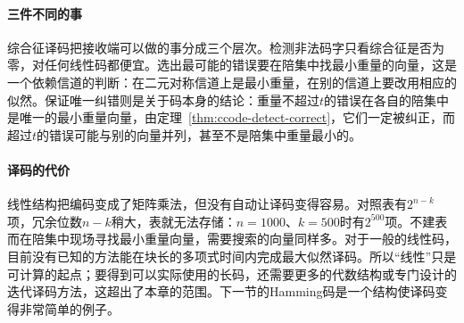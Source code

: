 \paragraph{三件不同的事}
综合征译码把接收端可以做的事分成三个层次。检测非法码字只看综合征是否为零，对任何线性码都便宜。选出最可能的错误要在陪集中找最小重量的向量，这是一个依赖信道的判断：在二元对称信道上是最小重量，在别的信道上要改用相应的似然。保证唯一纠错则是关于码本身的结论：重量不超过$t$的错误在各自的陪集中是唯一的最小重量向量，由定理~\ref{thm:ccode-detect-correct}，它们一定被纠正，而超过$t$的错误可能与别的向量并列，甚至不是陪集中重量最小的。

\paragraph{译码的代价}
线性结构把编码变成了矩阵乘法，但没有自动让译码变得容易。对照表有$2^{n-k}$项，冗余位数$n-k$稍大，表就无法存储：$n=1000$、$k=500$时有$2^{500}$项。不建表而在陪集中现场寻找最小重量向量，需要搜索的向量同样多。对于一般的线性码，目前没有已知的方法能在块长的多项式时间内完成最大似然译码。所以“线性”只是可计算的起点；要得到可以实际使用的长码，还需要更多的代数结构或专门设计的迭代译码方法，这超出了本章的范围。下一节的Hamming码是一个结构使译码变得非常简单的例子。
